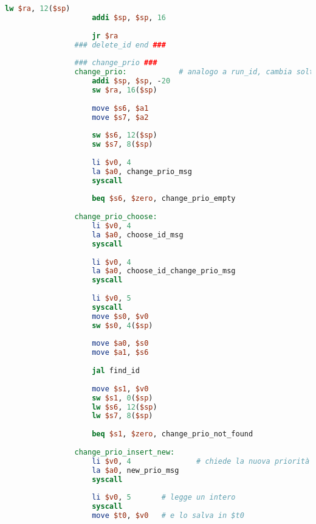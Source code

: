 \begin{center}
\begin{lstlisting}[language=mips, gobble=14, stepnumber=1]
                    lw $ra, 12($sp)
                    addi $sp, $sp, 16
                    
                    jr $ra
                ### delete_id end ###
                    
                ### change_prio ###
                change_prio:            # analogo a run_id, cambia soltanto la parte centrale
                    addi $sp, $sp, -20
                    sw $ra, 16($sp)
                
                    move $s6, $a1
                    move $s7, $a2
                    
                    sw $s6, 12($sp)
                    sw $s7, 8($sp)
                
                    li $v0, 4
                    la $a0, change_prio_msg
                    syscall
                    
                    beq $s6, $zero, change_prio_empty
                    
                change_prio_choose:
                    li $v0, 4
                    la $a0, choose_id_msg
                    syscall
                    
                    li $v0, 4
                    la $a0, choose_id_change_prio_msg
                    syscall
                    
                    li $v0, 5
                    syscall
                    move $s0, $v0
                    sw $s0, 4($sp)
                    
                    move $a0, $s0
                    move $a1, $s6
                    
                    jal find_id
                    
                    move $s1, $v0
                    sw $s1, 0($sp)
                    lw $s6, 12($sp)
                    lw $s7, 8($sp)
                    
                    beq $s1, $zero, change_prio_not_found
                    
                change_prio_insert_new:
                    li $v0, 4               # chiede la nuova priorità del task
                    la $a0, new_prio_msg
                    syscall
                    
                    li $v0, 5       # legge un intero
                    syscall
                    move $t0, $v0   # e lo salva in $t0
                

\end{lstlisting}
\end{center}
